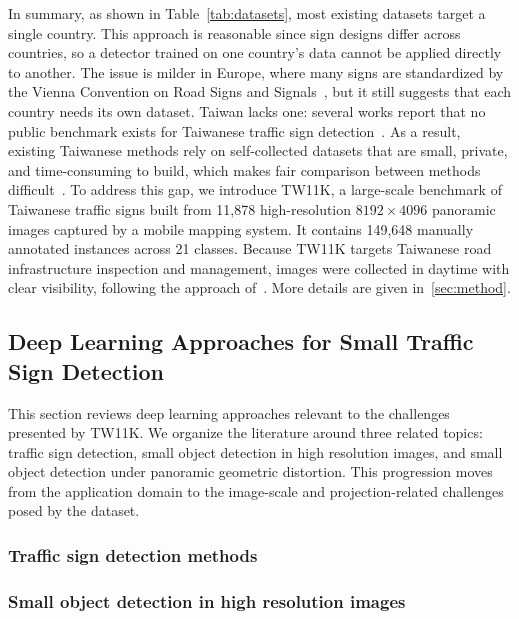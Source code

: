 \documentclass[runningheads]{llncs}
\begin{document}
In summary, as shown in Table~\ref{tab:datasets}, most existing datasets target a single country. This approach is reasonable since sign designs differ across countries, so a detector trained on one country's data cannot be applied directly to another. The issue is milder in Europe, where many signs are standardized by the Vienna Convention on Road Signs and Signals~\cite{mogelmose2012vision}, but it still suggests that each country needs its own dataset. Taiwan lacks one: several works report that no public benchmark exists for Taiwanese traffic sign detection~\cite{dewi2022deep,lu2022hierarchical,suwattanapunkul2023efficient,chang2024effective}. As a result, existing Taiwanese methods rely on self-collected datasets that are small, private, and time-consuming to build, which makes fair comparison between methods difficult~\cite{lu2022hierarchical,li2022traffic,suwattanapunkul2023efficient,lin2026csformer}. To address this gap, we introduce TW11K, a large-scale benchmark of Taiwanese traffic signs built from 11,878 high-resolution $8192\times4096$ panoramic images captured by a mobile mapping system. It contains 149,648 manually annotated instances across 21 classes. Because TW11K targets Taiwanese road infrastructure inspection and management, images were collected in daytime with clear visibility, following the approach of~\cite{tabernik2019deep}. More details are given in~\ref{sec:method}.

\subsection{Deep Learning Approaches for Small Traffic Sign Detection}
This section reviews deep learning approaches relevant to the challenges presented by TW11K. We organize the literature around three related topics: traffic sign detection, small object detection in high resolution images, and small object detection under panoramic geometric distortion. This progression moves from the application domain to the image-scale and projection-related challenges posed by the dataset.

\subsubsection{Traffic sign detection methods}

\subsubsection{Small object detection in high resolution images}
\end{document}
